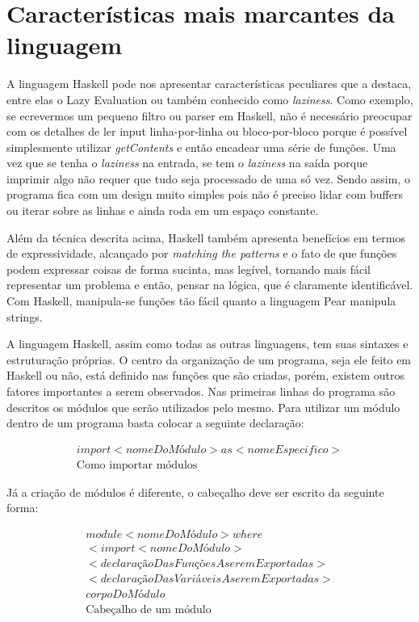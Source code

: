 \chapter{Características mais marcantes da linguagem}

A linguagem Haskell pode nos apresentar características peculiares que a destaca, entre elas o Lazy Evaluation ou também conhecido como \emph{laziness}. Como exemplo,
se ecrevermos um pequeno filtro ou parser em Haskell, não é necessário preocupar com os detalhes de ler input linha-por-linha ou bloco-por-bloco porque é possível
simplesmente utilizar \emph{getContents} e então encadear uma série de funções. Uma vez que se tenha o \emph{laziness} na entrada, se tem o \emph{laziness} na saída porque imprimir
algo não requer que tudo seja processado de uma só vez. Sendo assim, o programa fica com um design muito simples pois não é preciso lidar com buffers ou iterar sobre
as linhas e ainda roda em um espaço constante.

Além da técnica descrita acima, Haskell também apresenta benefícios em termos de expressividade, alcançado por \emph{matching the patterns} e o fato de que funções podem
expressar coisas de forma sucinta, mas legível, tornando mais fácil representar um problema e então, pensar na lógica, que é claramente identificável. Com Haskell,
manipula-se funções tão fácil quanto a linguagem Pear manipula strings.

A linguagem Haskell, assim como todas as outras linguagens, tem suas sintaxes e estruturação próprias. O centro da organização de um programa, seja ele feito em Haskell ou não,
está definido nas funções que são criadas, porém, existem outros fatores importantes a serem observados.
Nas primeiras linhas do programa são descritos os módulos que serão utilizados pelo mesmo. Para utilizar um módulo dentro de um programa basta colocar a seguinte declaração:

\begin{gather*}
  import<nomeDoMódulo> as <nomeEspecifico> \\
  \text{Como importar módulos}
\end{gather*}

Já a criação de módulos é diferente, o cabeçalho deve ser escrito da seguinte forma:

\begin{gather*}
  module<nomeDoMódulo>where \\
  <import<nomeDoMódulo> \\
  <declaraçãoDasFunçõesAseremExportadas> \\
  <declaraçãoDasVariáveisAseremExportadas> \\
  corpoDoMódulo \\
  \text{Cabeçalho de um módulo}
\end{gather*}

